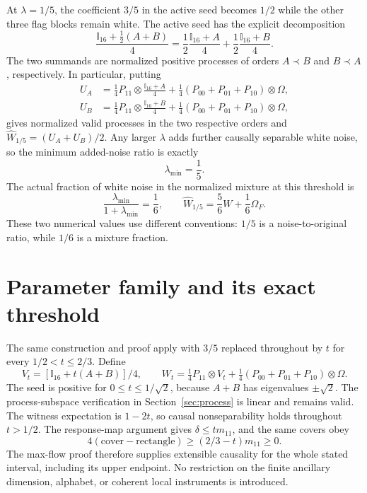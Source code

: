 \documentclass[11pt,letterpaper]{article}
\theoremstyle{remark}\newtheorem{remark}[theorem]{Remark}
\newcommand{\I}{\mathbb I}
\begin{document}
At $\lambda=1/5$, the coefficient $3/5$ in the active seed becomes $1/2$ while the other three flag blocks remain white. The active seed has the explicit decomposition
\begin{equation}\label{eq:thresholdseed}
 \frac{\I_{16}+\frac12(A+B)}4
 =\frac12\frac{\I_{16}+A}{4}
  +\frac12\frac{\I_{16}+B}{4}.
\end{equation}
The two summands are normalized positive processes of orders $A\prec B$ and $B\prec A$, respectively. In particular, putting
\begin{align*}
 U_A&=\frac14P_{11}\otimes\frac{\I_{16}+A}{4}
       +\frac14(P_{00}+P_{01}+P_{10})\otimes\Omega,\\
 U_B&=\frac14P_{11}\otimes\frac{\I_{16}+B}{4}
       +\frac14(P_{00}+P_{01}+P_{10})\otimes\Omega,
\end{align*}
gives normalized valid processes in the two respective orders and
$\widehat W_{1/5}=(U_A+U_B)/2$.
Any larger $\lambda$ adds further causally separable white noise, so the minimum added-noise ratio is exactly
\begin{equation}\label{eq:robustness-result}
 \boxed{\lambda_{\min}=\frac15.}
\end{equation}
The actual fraction of white noise in the normalized mixture at this threshold is
\[
 \frac{\lambda_{\min}}{1+\lambda_{\min}}=\frac16,
 \qquad
 \widehat W_{1/5}=\frac56W+\frac16\Omega_F.
\]
These two numerical values use different conventions: $1/5$ is a noise-to-original ratio, while $1/6$ is a mixture fraction.


\section{Parameter family and its exact threshold}\label{sec:family}
The same construction and proof apply with $3/5$ replaced throughout by
$t$ for every $1/2<t\le2/3$. Define
\[
 V_t=[\I_{16}+t(A+B)]/4,\qquad
 W_t=\tfrac14P_{11}\otimes V_t+
      \tfrac14(P_{00}+P_{01}+P_{10})\otimes\Omega.
\]
The seed is positive for $0\le t\le1/\sqrt2$, because $A+B$ has
eigenvalues $\pm\sqrt2$. The process-subspace verification in
Section~\ref{sec:process} is linear and remains valid. The witness expectation
is $1-2t$, so causal nonseparability holds throughout $t>1/2$.
The response-map argument gives $\delta\le t m_{11}$, and the same covers obey
\[
4(\text{cover}-\text{rectangle})\ge(2/3-t)m_{11}\ge0.
\]
The max-flow proof therefore supplies extensible causality for the whole stated
interval, including its upper endpoint. No restriction on the finite ancillary
dimension, alphabet, or coherent local instruments is introduced.
\end{document}
